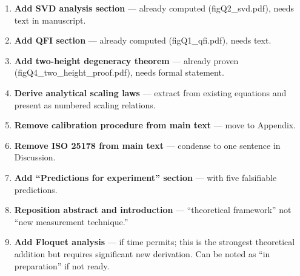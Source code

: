 \documentclass[11pt,a4paper]{article}
\begin{document}
\begin{enumerate}[label=\textbf{Step \arabic*}, leftmargin=*]
    \item \textbf{Add SVD analysis section} --- already computed
          (figQ2\_svd.pdf), needs text in manuscript.
    \item \textbf{Add QFI section} --- already computed (figQ1\_qfi.pdf),
          needs text.
    \item \textbf{Add two-height degeneracy theorem} --- already proven
          (figQ4\_two\_height\_proof.pdf), needs formal statement.
    \item \textbf{Derive analytical scaling laws} --- extract from existing
          equations and present as numbered scaling relations.
    \item \textbf{Remove calibration procedure from main text} --- move to
          Appendix.
    \item \textbf{Remove ISO 25178 from main text} --- condense to one
          sentence in Discussion.
    \item \textbf{Add ``Predictions for experiment'' section} --- with five
          falsifiable predictions.
    \item \textbf{Reposition abstract and introduction} --- ``theoretical
          framework'' not ``new measurement technique.''
    \item \textbf{Add Floquet analysis} --- if time permits; this is the
          strongest theoretical addition but requires significant new
          derivation.  Can be noted as ``in preparation'' if not ready.
\end{enumerate}
\end{document}
